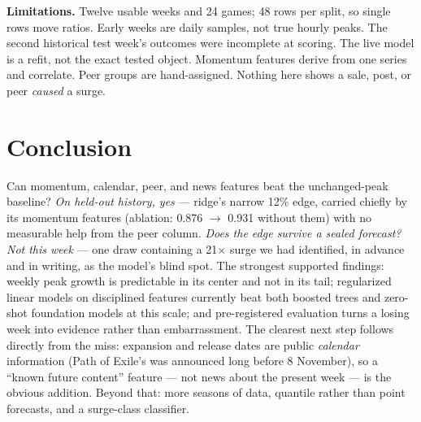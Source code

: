 \documentclass[10pt,letterpaper]{article}
\begin{document}
\textbf{Limitations.} Twelve usable weeks and 24 games; 48 rows per split, so single rows move ratios. Early weeks are daily samples, not true hourly peaks. The second historical test week's outcomes were incomplete at scoring. The live model is a refit, not the exact tested object. Momentum features derive from one series and correlate. Peer groups are hand-assigned. Nothing here shows a sale, post, or peer \emph{caused} a surge.

\FloatBarrier
\section{Conclusion}
Can momentum, calendar, peer, and news features beat the unchanged-peak baseline? \emph{On held-out history, yes} --- ridge's narrow 12\% edge, carried chiefly by its momentum features (ablation: 0.876 $\to$ 0.931 without them) with no measurable help from the peer column. \emph{Does the edge survive a sealed forecast? Not this week} --- one draw containing a 21$\times$ surge we had identified, in advance and in writing, as the model's blind spot. The strongest supported findings: weekly peak growth is predictable in its center and not in its tail; regularized linear models on disciplined features currently beat both boosted trees and zero-shot foundation models at this scale; and pre-registered evaluation turns a losing week into evidence rather than embarrassment. The clearest next step follows directly from the miss: expansion and release dates are public \emph{calendar} information (Path of Exile's was announced long before 8 November), so a ``known future content'' feature --- not news about the present week --- is the obvious addition. Beyond that: more seasons of data, quantile rather than point forecasts, and a surge-class classifier.
\end{document}
